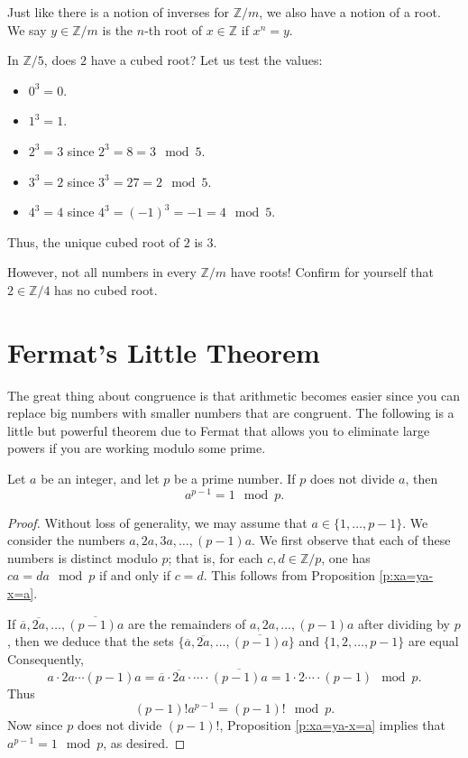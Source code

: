 \documentclass[11pt,dvipsnames]{book}
\numberwithin{figure}{section} %
\numberwithin{table}{section} %
\begin{document}
Just like there is a notion of inverses for $\mathbb{Z}/m$, we also have a notion of a root. We say $y\in\mathbb{Z}/m$ is the $n$-th root of $x\in\mathbb{Z}$ if $x^n=y$.

\begin{example}
In $\mathbb{Z}/{5}$, does $2$ have a cubed root?
Let us test the values:

\begin{itemize}
\item $0^{3}=0$.
\item $1^{3}=1$.
\item $2^{3}=3$ since $2^{3} = 8 = 3\mod 5$.
\item $3^{3}=2$ since $3^{3} = 27 = 2\mod 5$.
\item $4^{3}=4$ since $4^{3} = (-1)^{3}=-1 = 4 \mod 5$.
\end{itemize}
Thus, the unique cubed root of $2$ is $3$. \\
\end{example}

However, not all numbers in every $\mathbb{Z}/m$ have roots! Confirm for yourself that $2\in\mathbb{Z}/{4}$ has no cubed root.

\section{Fermat's Little Theorem}

The great thing about congruence is that arithmetic  becomes easier since you can replace big numbers with smaller numbers that are congruent. The following is a little but powerful theorem due to Fermat that allows you to eliminate large powers if you are working modulo some prime.

\begin{theorem}
Let $a$ be an integer, and let $p$ be a prime number.
If $p$ does not divide $a$, then
\[
a^{p-1} = 1 \mod p.
\]
\end{theorem}

\begin{proof}
Without loss of generality, we may assume that $a \in \{1,\dots,p-1\}$.
We consider the numbers $a,2a,3a,\dots,(p-1)a$. We first observe that each of these numbers is distinct modulo $p$;
that is, for each $c,d\in \mathbb{Z}/p$, one has $ca = da\mod p$ if and only if $c=d$.
This follows from Proposition \ref{p:xa=ya-x=a}.

If $\overline{a},\overline{2a}, \dots, \overline{(p-1)a}$ are the remainders of $a,2a,\dots,(p-1)a$ after dividing by $p$, then we deduce that the sets $\{\overline{a},\overline{2a}, \dots, \overline{(p-1)a}\}$ and $\{1,2,\dots,p-1\}$ are equal
Consequently,
\[
a\cdot 2a \cdots (p-1)a = \overline{a}\cdot\overline{2a}\cdot \cdots\cdot \overline{(p-1)a} = 1\cdot 2 \cdots \cdot (p-1) \mod p.\]
Thus
\[
(p-1)!a^{p-1} = (p-1)!\mod p.
\]
Now since $p$ does not divide $(p-1)!$, Proposition \ref{p:xa=ya-x=a} implies that $a^{p-1} = 1 \mod p$, as desired.
\end{proof}
\end{document}
